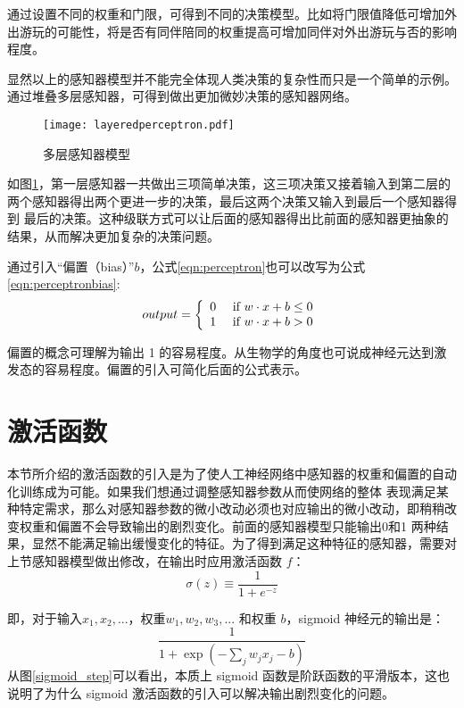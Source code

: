 通过设置不同的权重和门限，可得到不同的决策模型。比如将门限值降低可增加外出游玩的可能性，将是否有同伴陪同的权重提高可增加同伴对外出游玩与否的影响程度。

显然以上的感知器模型并不能完全体现人类决策的复杂性而只是一个简单的示例。通过堆叠多层感知器，可得到做出更加微妙决策的感知器网络。

\begin{figure}[h]
	\texttt{[image: layeredperceptron.pdf]}
	\caption{多层感知器模型}
	\label{layeredperceptron}
\end{figure}

如图\ref{layeredperceptron}，第一层感知器一共做出三项简单决策，这三项决策又接着输入到第二层的两个感知器得出两个更进一步的决策，最后这两个决策又输入到最后一个感知器得到
最后的决策。这种级联方式可以让后面的感知器得出比前面的感知器更抽象的结果，从而解决更加复杂的决策问题。

通过引入“偏置（bias）”$b$，公式\ref{eqn:perceptron}也可以改写为公式\ref{eqn:perceptronbias}:
\begin{equation}
	\label{eqn:perceptronbias}
output = \left\{ \begin{array} { l l } { 0 } & { \text { if } w \cdot x + b \leq 0 } \\ { 1 } & { \text { if } w \cdot x + b > 0 } \end{array} \right.
\end{equation}

偏置的概念可理解为输出 1 的容易程度。从生物学的角度也可说成神经元达到激发态的容易程度。偏置的引入可简化后面的公式表示。

\section{激活函数}
本节所介绍的激活函数的引入是为了使人工神经网络中感知器的权重和偏置的自动化训练成为可能。如果我们想通过调整感知器参数从而使网络的整体
表现满足某种特定需求，那么对感知器参数的微小改动必须也对应输出的微小改动，即稍稍改变权重和偏置不会导致输出的剧烈变化。前面的感知器模型只能输出0和1
两种结果，显然不能满足输出缓慢变化的特征。为了得到满足这种特征的感知器，需要对上节感知器模型做出修改，在输出时应用激活函数 $f$：
\begin{equation}
	\label{eqn:sigmoid}
	\sigma ( z ) \equiv \frac { 1 } { 1 + e ^ { - z } }
\end{equation}

即，对于输入$x_1, x_2, ...$，权重$w_1, w_2, w_3,...$ 和权重 $b$，sigmoid 神经元的输出是：
\begin{equation}
	\label{eqn:sigmoidoutput}
	\frac { 1 } { 1 + \exp \left( - \sum _ { j } w _ { j } x _ { j } - b \right) }
\end{equation}
从图\ref{sigmoid_step}可以看出，本质上 sigmoid 函数是阶跃函数的平滑版本，这也说明了为什么 sigmoid 激活函数的引入可以解决输出剧烈变化的问题。

